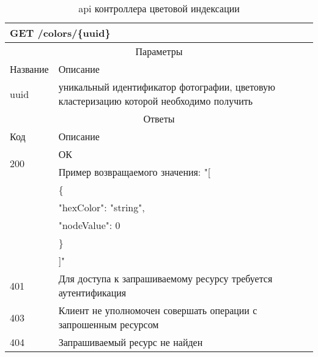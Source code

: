 \begin{table}[H]
  \caption{api контроллера цветовой индексации}\label{api-colors-table}
  \begin{tabular}{|p{6cm}|p{10cm}|}
  \hline \multicolumn{2}{|l|}{GET /colors/\{uuid\}} \\
  \hline \multicolumn{2}{|c|}{Параметры} \\
  \hline Название & Описание \\
  \hline uuid & уникальный идентификатор фотографии, цветовую кластеризацию которой необходимо получить \\
  \hline \multicolumn{2}{|c|}{Ответы} \\
  \hline Код & Описание \\
  \hline \multirow{2}{=}{200} & ОК \\
   & Пример возвращаемого значения: "[ \\
   & \{ \\
   &   "hexColor": "string", \\
   &   "nodeValue": 0 \\
   & \} \\
   & ]"\\
  \hline 401 & Для доступа к запрашиваемому ресурсу требуется аутентификация \\
  \hline 403 & Клиент не уполномочен совершать операции с запрошенным ресурсом \\
  \hline 404 & Запрашиваемый ресурс не найден \\
  \hline
  \end{tabular}
\end{table}

